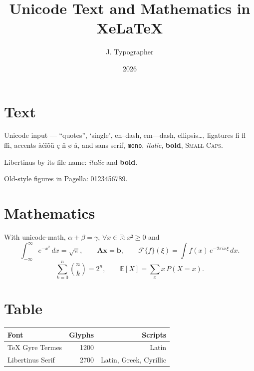 \documentclass[11pt,a4paper]{article}
\title{Unicode Text and Mathematics in XeLaTeX}
\author{J. Typographer}
\date{2026}
\begin{document}
\maketitle
\section{Text}
Unicode input — “quotes”, ‘single’, en–dash, em—dash, ellipsis…, ligatures
fi fl ffi, accents àéîõü ç ñ ø å, and \textsf{sans serif}, \texttt{mono},
\textit{italic}, \textbf{bold}, \textsc{Small Caps}.

{\libertinus Libertinus by its file name: \textit{italic} and \textbf{bold}.}

{\pagella Old-style figures in Pagella: 0123456789.}
\section{Mathematics}
With unicode-math, $α + β = γ$, $∀x ∈ ℝ: x² ≥ 0$ and
\[
  \int_{-\infty}^{\infty} e^{-x^2}\,dx = \sqrt{\pi}, \qquad
  \mathbf{A}\mathbf{x} = \mathbf{b}, \qquad
  \mathcal{F}\{f\}(\xi) = \int f(x)\,e^{-2\pi i x \xi}\,dx .
\]
\begin{equation}
  \sum_{k=0}^{n} \binom{n}{k} = 2^n , \qquad \mathbb{E}[X] = \sum_x x\,P(X=x).
\end{equation}
\section{Table}
\begin{tabular}{lrr}
\toprule
Font & Glyphs & Scripts \\
\midrule
TeX Gyre Termes & 1200 & Latin \\
Libertinus Serif & 2700 & Latin, Greek, Cyrillic \\
\bottomrule
\end{tabular}
\end{document}
